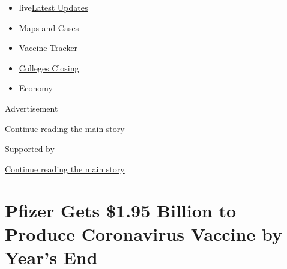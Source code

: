 \begin{itemize}
\tightlist
\item
  live\href{https://www.nytimes3xbfgragh.onion/2020/08/21/world/covid-19-coronavirus.html?name=styln-coronavirus-national\&region=TOP_BANNER\&variant=undefined\&block=storyline_menu_recirc\&action=click\&pgtype=Article\&impression_id=d34e7cb1-e395-11ea-81b0-ed0ce085a510}{Latest
  Updates}
\item
  \href{https://www.nytimes3xbfgragh.onion/interactive/2020/us/coronavirus-us-cases.html?name=styln-coronavirus-national\&region=TOP_BANNER\&variant=undefined\&block=storyline_menu_recirc\&action=click\&pgtype=Article\&impression_id=d34e7cb2-e395-11ea-81b0-ed0ce085a510}{Maps
  and Cases}
\item
  \href{https://www.nytimes3xbfgragh.onion/interactive/2020/science/coronavirus-vaccine-tracker.html?name=styln-coronavirus-national\&region=TOP_BANNER\&variant=undefined\&block=storyline_menu_recirc\&action=click\&pgtype=Article\&impression_id=d34e7cb3-e395-11ea-81b0-ed0ce085a510}{Vaccine
  Tracker}
\item
  \href{https://www.nytimes3xbfgragh.onion/2020/08/19/us/colleges-closing-covid.html?name=styln-coronavirus-national\&region=TOP_BANNER\&variant=undefined\&block=storyline_menu_recirc\&action=click\&pgtype=Article\&impression_id=d34e7cb4-e395-11ea-81b0-ed0ce085a510}{Colleges
  Closing}
\item
  \href{https://www.nytimes3xbfgragh.onion/live/2020/08/20/business/stock-market-today-coronavirus?name=styln-coronavirus-national\&region=TOP_BANNER\&variant=undefined\&block=storyline_menu_recirc\&action=click\&pgtype=Article\&impression_id=d34e7cb5-e395-11ea-81b0-ed0ce085a510}{Economy}
\end{itemize}

Advertisement

\protect\hyperlink{after-top}{Continue reading the main story}

Supported by

\protect\hyperlink{after-sponsor}{Continue reading the main story}

\hypertarget{pfizer-gets-195-billion-to-produce-coronavirus-vaccine-by-years-end}{%
\section{Pfizer Gets \$1.95 Billion to Produce Coronavirus Vaccine by
Year's
End}\label{pfizer-gets-195-billion-to-produce-coronavirus-vaccine-by-years-end}}

